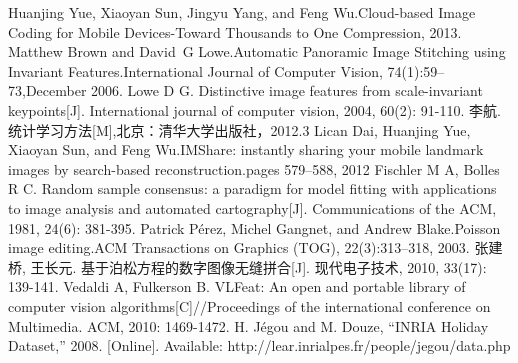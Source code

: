 \documentclass[UTF8]{csoarticle}
\begin{document}
\begin{thebibliography}{10} %
     Huanjing Yue, Xiaoyan Sun, Jingyu Yang, and Feng Wu.Cloud-based Image Coding for Mobile Devices-Toward Thousands to One Compression, 2013.
     Matthew Brown and David~G Lowe.Automatic Panoramic Image Stitching using Invariant Features.International Journal of Computer Vision, 74(1):59--73,December 2006.
     Lowe D G. Distinctive image features from scale-invariant keypoints[J]. International journal of computer vision, 2004, 60(2): 91-110.
     李航.统计学习方法[M],北京：清华大学出版社，2012.3
     Lican Dai, Huanjing Yue, Xiaoyan Sun, and Feng Wu.IMShare: instantly sharing your mobile landmark images by search-based reconstruction.pages 579--588, 2012
     Fischler M A, Bolles R C. Random sample consensus: a paradigm for model fitting with applications to image analysis and automated cartography[J]. Communications of the ACM, 1981, 24(6): 381-395.
     Patrick P{\'e}rez, Michel Gangnet, and Andrew Blake.Poisson image editing.ACM Transactions on Graphics (TOG), 22(3):313--318, 2003.
     张建桥, 王长元. 基于泊松方程的数字图像无缝拼合[J]. 现代电子技术, 2010, 33(17): 139-141.
     Vedaldi A, Fulkerson B. VLFeat: An open and portable library of computer vision algorithms[C]//Proceedings of the international conference on Multimedia. ACM, 2010: 1469-1472.
     H. Jégou and M. Douze, “INRIA Holiday Dataset,” 2008. [Online]. Available: http://lear.inrialpes.fr/people/jegou/data.php
\end{thebibliography}
\end{document}
